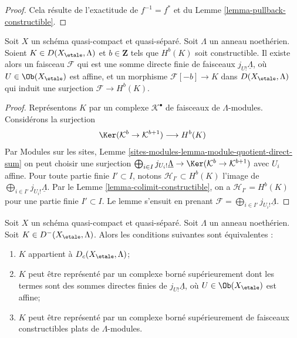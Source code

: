 \begin{proof}
Cela résulte de l'exactitude de $f^{-1} = f^*$ et du
Lemme \ref{lemma-pullback-constructible}.
\end{proof}

\begin{lemma}
\label{lemma-one-constructible}
Soit $X$ un schéma quasi-compact et quasi-séparé.
Soit $\Lambda$ un anneau noethérien. Soient $K \in D(X_\etale, \Lambda)$
et $b \in \mathbf{Z}$ tels que $H^b(K)$ soit constructible.
Il existe alors un faisceau $\mathcal{F}$ qui est une somme directe finie
de faisceaux $j_{U!}\underline{\Lambda}$, où $U \in \Ob(X_\etale)$ est affine, et
un morphisme $\mathcal{F}[-b] \to K$ dans $D(X_\etale, \Lambda)$
qui induit une surjection $\mathcal{F} \to H^b(K)$.
\end{lemma}

\begin{proof}
Représentons $K$ par un complexe $\mathcal{K}^\bullet$ de faisceaux de
$\Lambda$-modules. Considérons la surjection
$$
\Ker(\mathcal{K}^b \to \mathcal{K}^{b + 1})
\longrightarrow
H^b(K)
$$
Par Modules sur les sites, Lemme
\ref{sites-modules-lemma-module-quotient-direct-sum}
on peut choisir une surjection
$\bigoplus_{i \in I} j_{U_i!} \underline{\Lambda} \to
\Ker(\mathcal{K}^b \to \mathcal{K}^{b + 1})$
avec $U_i$ affine. Pour toute partie finie $I' \subset I$, notons
$\mathcal{H}_{I'} \subset H^b(K)$ l'image de
$\bigoplus_{i \in I'} j_{U_i!} \underline{\Lambda}$. Par le
Lemme \ref{lemma-colimit-constructible},
on a $\mathcal{H}_{I'} = H^b(K)$ pour une partie finie $I' \subset I$.
Le lemme s'ensuit en prenant
$\mathcal{F} = \bigoplus_{i \in I'} j_{U_i!} \underline{\Lambda}$.
\end{proof}

\begin{lemma}
\label{lemma-bounded-above-c}
Soit $X$ un schéma quasi-compact et quasi-séparé.
Soit $\Lambda$ un anneau noethérien. Soit $K \in D^-(X_\etale, \Lambda)$. Alors
les conditions suivantes sont équivalentes :
\begin{enumerate}
\item $K$ appartient à $D_c(X_\etale, \Lambda)$;
\item $K$ peut être représenté par un complexe borné supérieurement
dont les termes sont des sommes directes finies de $j_{U!}\underline{\Lambda}$,
où $U \in \Ob(X_\etale)$ est affine;
\item $K$ peut être représenté par un complexe borné supérieurement
de faisceaux constructibles plats de $\Lambda$-modules.
\end{enumerate}
\end{lemma}

